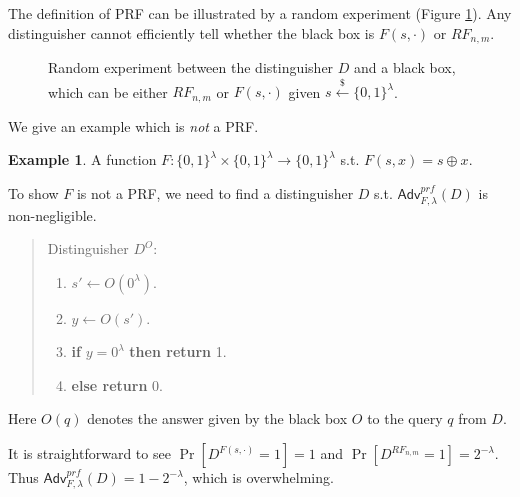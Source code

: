 \documentclass[12pt]{article}
\newcommand{\bits}{\{0,1\}}
\newcommand{\getsr}{\stackrel{\$}{\gets}}
\newcommand{\Adv}{\mathsf{Adv}}
\theoremstyle{definition}
\newtheorem{example}[theorem]{Example}
\begin{document}
The definition of PRF can be illustrated by a random experiment (Figure \ref{fig:re}). Any distinguisher cannot efficiently tell whether the black box is $F(s,\cdot)$ or $RF_{n,m}$.

\begin{figure}[!t]
\centering{}
\caption{Random experiment between the distinguisher $D$ and a black box, which can be either $RF_{n,m}$ or $F(s,\cdot)$ given $s\getsr\bits^\lambda$.}
\label{fig:re}
\end{figure}

We give an example which is \emph{not} a PRF.
\begin{example}
A function $F : \bits^\lambda \times \bits^\lambda \to \bits^{\lambda}$ s.t. $F(s,x) = s \oplus x$.

To show $F$ is not a PRF, we need to find a distinguisher $D$ s.t. $\Adv_{F,\lambda}^{prf}(D)$ is non-negligible.
\begin{quote}
Distinguisher $D^O$:
\begin{enumerate}
\item $s' \gets O(0^\lambda)$.
\item $y \gets O(s')$.
\item {\bf if} $y=0^\lambda$ {\bf then return} 1.
\item {\bf else return} 0.
\end{enumerate}
\end{quote}
Here $O(q)$ denotes the answer given by the black box $O$ to the query $q$ from $D$.

It is straightforward to see $\Pr[D^{F(s,\cdot)}=1]=1$ and $\Pr[D^{RF_{n,m}}=1]=2^{-\lambda}$. Thus $\Adv_{F,\lambda}^{prf}(D)=1-2^{-\lambda}$, which is overwhelming.
\end{example}
\end{document}
